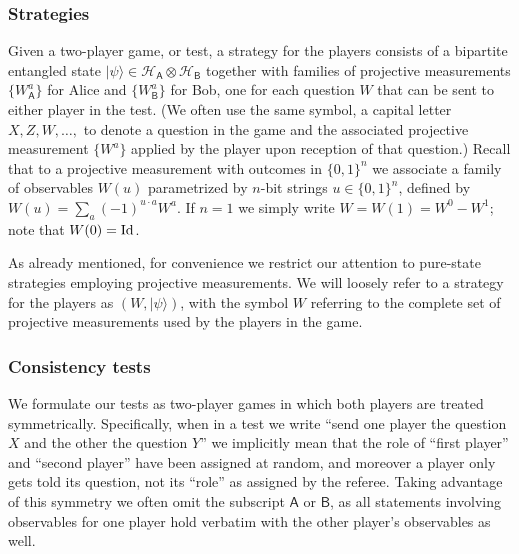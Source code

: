 \documentclass{toc}
\newcommand{\ket}[1]{|#1\rangle}
\newcommand{\Id}{\ensuremath{\mathop{\rm Id}\nolimits}}
\newcommand{\reg}[1]{{\textsf{#1}}}
\newcommand{\mH}{\mathcal{H}}
\begin{document}
\subsubsection{Strategies}

Given a two-player game, or test, a strategy for the players consists of a bipartite entangled state $\ket{\psi} \in \mH_\reg{A} \otimes \mH_\reg{B}$ together with families of projective  measurements $\{W^a_\reg{A}\}$ for Alice and $\{W_\reg{B}^a\}$ for Bob, one for each question $W$ that can be sent to either player in the test. (We often use the same symbol, a capital letter $X,Z,W,\ldots,$ to denote a question in the game and the associated projective measurement $\{W^a\}$ applied by the player upon reception of that question.) 
 Recall that to a projective measurement with outcomes in $\{0,1\}^n$ we  associate a family of observables $W(u)$ parametrized by $n$-bit strings $u\in\{0,1\}^n$, defined by $W(u) = \sum_a (-1)^{u\cdot a} W^a$. If $n=1$ we simply write $W=W(1)=W^0-W^1$; note that $W(0)=\Id$.

As already mentioned, for convenience we restrict our attention to pure-state strategies employing projective measurements. 
We will loosely refer to a strategy for the players as $(W,\ket{\psi})$, with the symbol $W$ referring to the complete set of projective measurements used by the players in the game.

\subsubsection{Consistency tests}
\label{sec:cons-test}

We formulate our tests as two-player games in which both players are treated symmetrically. Specifically, when in a test we write ``send one player the question $X$ and the other the question $Y$'' we implicitly mean that the role of ``first player'' and ``second player'' have been assigned at random, and moreover a player only gets told its question, not its ``role'' as assigned by the referee. 
 Taking advantage of this symmetry we often omit the subscript $\reg{A}$ or $\reg{B}$, as all statements involving observables for one player hold verbatim with the other player's observables as well. 
\end{document}
